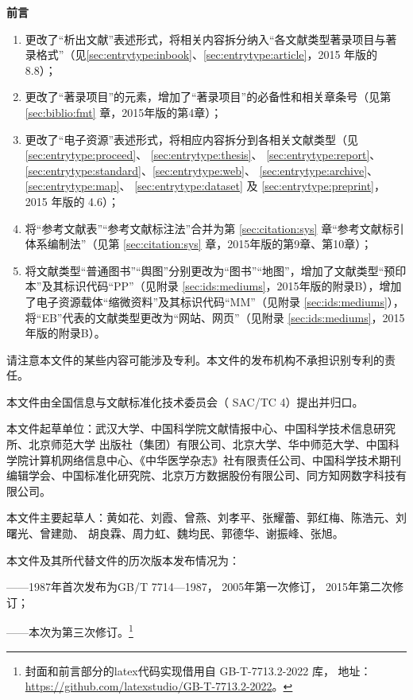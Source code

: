 \documentclass[twoside]{article}%
\newenvironment{preamble}[1]{\bgroup\vspace*{1.5cm}\centerline{\Large\textbf{#1}}\vspace{1cm}}{\clearpage\egroup}
\begin{document}
\begin{preamble}{前\qquad{}言}
\begin{enumerate}
“预印本” 的著录项目和著录格式（见 \ref{sec:entrytype:proceed}、 \ref{sec:entrytype:thesis}、 \ref{sec:entrytype:report}、
\ref{sec:entrytype:standard}、\ref{sec:entrytype:web}、 \ref{sec:entrytype:archive}、 \ref{sec:entrytype:map}、 \ref{sec:entrytype:dataset} 及 \ref{sec:entrytype:preprint}）；
  \item 更改了“析出文献”表述形式，将相关内容拆分纳入“各文献类型著录项目与著录格式”（见\ref{sec:entrytype:inbook}、\ref{sec:entrytype:article}，2015 年版的8.8）；
  \item 更改了“著录项目”的元素，增加了“著录项目”的必备性和相关章条号（见第
  \ref{sec:biblio:fmt} 章，2015年版的第4章）；
  \item 更改了“电子资源”表述形式，将相应内容拆分到各相关文献类型（见\ref{sec:entrytype:proceed}、 \ref{sec:entrytype:thesis}、 \ref{sec:entrytype:report}、
\ref{sec:entrytype:standard}、\ref{sec:entrytype:web}、 \ref{sec:entrytype:archive}、 \ref{sec:entrytype:map}、 \ref{sec:entrytype:dataset} 及 \ref{sec:entrytype:preprint}，2015 年版的 4.6）；
  \item 将“参考文献表”“参考文献标注法”合并为第 \ref{sec:citation:sys} 章“参考文献标引体系编制法”（见第 \ref{sec:citation:sys} 章，2015年版的第9章、第10章）；
  \item 将文献类型“普通图书”“舆图”分别更改为“图书”“地图”，增加了文献类型“预印本”及其标识代码“PP”（见附录 \ref{sec:ids:mediums}，2015年版的附录B），增加了电子资源载体“缩微资料”及其标识代码“MM”（见附录 \ref{sec:ids:mediums}），将“EB”代表的文献类型更改为“网站、网页”（见附录 \ref{sec:ids:mediums}，2015年版的附录B）。
\end{enumerate}

请注意本文件的某些内容可能涉及专利。本文件的发布机构不承担识别专利的责任。

本文件由全国信息与文献标准化技术委员会（ SAC/TC 4）提出并归口。

本文件起草单位：武汉大学、中国科学院文献情报中心、中国科学技术信息研究所、北京师范大学
出版社（集团）有限公司、北京大学、华中师范大学、中国科学院计算机网络信息中心、《中华医学杂志》社有限责任公司、中国科学技术期刊编辑学会、中国标准化研究院、北京万方数据股份有限公司、同方知网数字科技有限公司。

本文件主要起草人：黄如花、刘霞、曾燕、刘孝平、张耀蕾、郭红梅、陈浩元、刘曙光、曾建勋、
胡良霖、周力虹、魏均民、郭德华、谢振峰、张旭。

本文件及其所代替文件的历次版本发布情况为：

——1987年首次发布为GB/T 7714—1987， 2005年第一次修订， 2015年第二次修订；

——本次为第三次修订。\footnote{封面和前言部分的latex代码实现借用自 GB-T-7713.2-2022 库，
地址：\url{https://github.com/latexstudio/GB-T-7713.2-2022}。}
\end{preamble}
\end{document}
